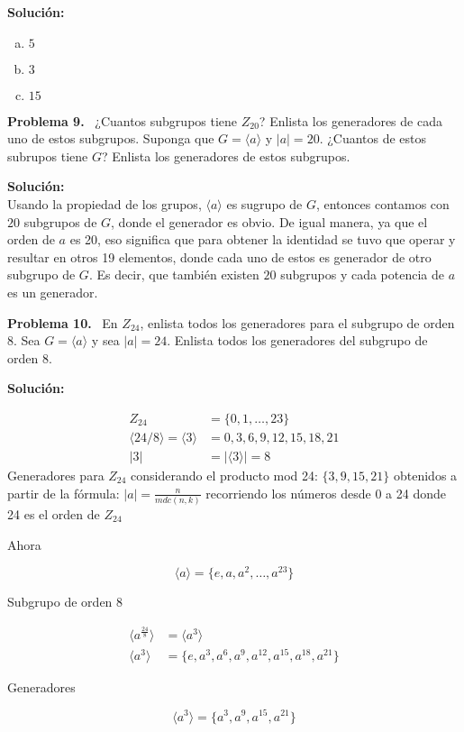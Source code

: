 \documentclass{article}
\newcounter{problem}
\newcounter{solution}
\newcommand\Problem[1]{%
  \stepcounter{problem}%
  \textbf{Problema #1.}~%
  \setcounter{solution}{0}%
}
\newcommand\TheSolution{%
  \textbf{Solución:}\\%
}
\begin{document}
\TheSolution{}
\begin{enumerate}[a.]
  \item $5$
  \item $3$
  \item $15$
\end{enumerate}

\Problem{9} ¿Cuantos subgrupos tiene $Z_{20}$? Enlista los generadores de cada
uno de estos subgrupos. Suponga que $G = \langle a \rangle$ y $|a| = 20$.
¿Cuantos de estos subrupos tiene $G$? Enlista los generadores de estos subgrupos.

\TheSolution{}
Usando la propiedad de los grupos, $\langle a\rangle$ es sugrupo de $G$,
entonces contamos con $20$ subgrupos de $G$, donde el generador es obvio. De
igual manera, ya que el orden de $a$ es 20, eso significa que para obtener la
identidad se tuvo que operar y resultar en otros 19 elementos, donde cada uno
de estos es generador de otro subgrupo de $G$. Es decir, que también existen
$20$ subgrupos y cada potencia de $a$ es un generador.

\Problem{10} En $Z_{24}$, enlista todos los generadores para el subgrupo de
orden 8. Sea $G = \langle a \rangle$ y sea $|a| = 24$. Enlista todos los
generadores del subgrupo de orden 8.

\TheSolution{}

\[
\begin{align*}
    Z_{24} &= \{0,1,\ldots,23\} \\
		\langle 24/8 \rangle = \langle 3 \rangle &= {0, 3, 6, 9, 12, 15, 18, 21}
    \\
		|3| &= |\langle 3 \rangle| = 8
\end{align*}
\]
Generadores para $Z_{24}$ considerando el producto mod 24: $\{3,9,15,21\}$
obtenidos a partir de la fórmula: $|a|=\frac{n}{mdc(n,k)}$ recorriendo los
números desde 0 a 24 donde 24 es el orden de $Z_{24}$

Ahora

\[
\langle a \rangle  = \{e, a, a^{2}, \ldots, a^{23}\}
\]

Subgrupo de orden 8

\[
\begin{align*}
  \langle a^{\frac{24}{8}}\rangle &= \langle a^{3} \rangle \\
  \langle a^{3} \rangle &= \{e, a^{3}, a^{6}, a^{9}, a^{12}, a^{15}, a^{18}, a^{21}\}
\end{align*}
\]

Generadores

\[
\langle a^{3} \rangle = \{a^{3}, a^{9}, a^{15}, a^{21}\}
\]
\end{document}
